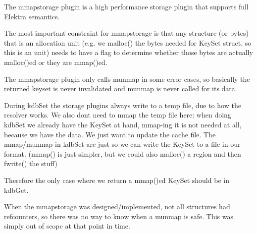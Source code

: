 \label{doc_contrib_mmapstorage_md_md_doc_contrib_mmapstorage}%
%
 The {\ttfamily mmapstorage} plugin is a high performance storage plugin that supports full Elektra semantics.

The most important constraint for {\ttfamily mmapstorage} is that any structure (or bytes) that is an allocation unit (e.\+g. we {\ttfamily malloc()} the bytes needed for {\ttfamily Key\+Set} struct, so this is an unit) needs to have a flag to determine whether those bytes are actually {\ttfamily malloc()}ed or they are {\ttfamily mmap()}ed.

The {\ttfamily mmapstorage} plugin only calls {\ttfamily munmap} in some error cases, so basically the returned keyset is never invalidated and {\ttfamily munmap} is never called for its data.

During {\ttfamily kdb\+Set} the storage plugins always write to a temp file, due to how the resolver works. We also don\textquotesingle{}t need to {\ttfamily mmap} the temp file here\+: when doing {\ttfamily kdb\+Set} we already have the {\ttfamily Key\+Set} at hand, {\ttfamily mmap}-\/ing it is not needed at all, because we have the data. We just want to update the cache file. The {\ttfamily mmap}/{\ttfamily munmap} in {\ttfamily kdb\+Set} are just so we can write the {\ttfamily Key\+Set} to a file in our format. ({\ttfamily mmap()} is just simpler, but we could also {\ttfamily malloc()} a region and then {\ttfamily fwrite()} the stuff)

Therefore the only case where we return a {\ttfamily mmap()}ed Key\+Set should be in {\ttfamily kdb\+Get}.

When the {\ttfamily mmapstorage} was designed/implemented, not all structures had refcounters, so there was no way to know when a {\ttfamily munmap} is safe. This was simply out of scope at that point in time. 